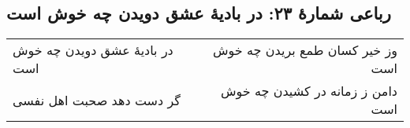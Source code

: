 \begin{center}
\section*{رباعی شمارهٔ ۲۳: در بادیۀ عشق دویدن چه خوش است}
\label{sec:023}
\begin{longtable}{l p{0.5cm} r}
در بادیهٔ عشق دویدن چه خوش است
&&
وز خیر کسان طمع بریدن چه خوش است
\\
گر دست دهد صحبت اهل نفسی
&&
دامن ز زمانه در کشیدن چه خوش است
\\
\end{longtable}
\end{center}
